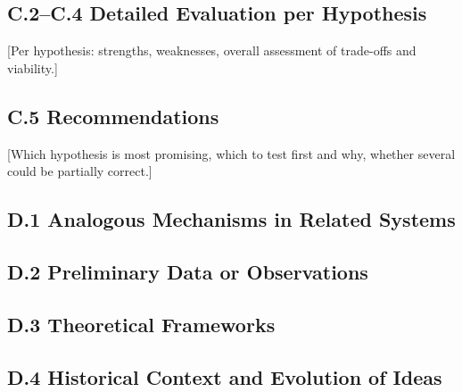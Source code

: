 \documentclass[11pt,letterpaper]{article}
\begin{document}
\subsection*{C.2--C.4 Detailed Evaluation per Hypothesis}
[Per hypothesis: strengths, weaknesses, overall assessment of trade-offs and viability.]
\subsection*{C.5 Recommendations}
[Which hypothesis is most promising, which to test first and why, whether several could be partially correct.]

\newpage
{}
\subsection*{D.1 Analogous Mechanisms in Related Systems}
\subsection*{D.2 Preliminary Data or Observations}
\subsection*{D.3 Theoretical Frameworks}
\subsection*{D.4 Historical Context and Evolution of Ideas}

\newpage

\end{document}
